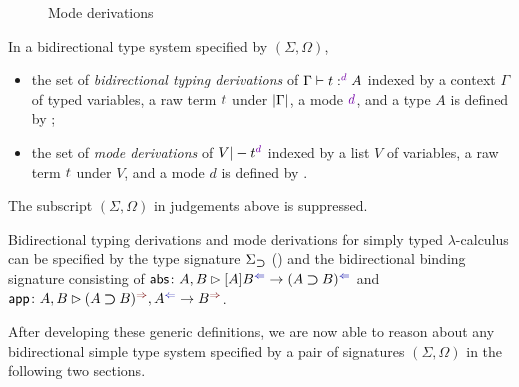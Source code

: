 \begin{definition}
\begin{figure}
    \caption{Mode derivations}
    \label{fig:mode-derivations}
  \end{figure}
  In a bidirectional type system specified by $(\Sigma, \Omega)$,
  \begin{itemize}
    \item the set of \emph{bidirectional typing derivations} of $\Gamma \vdash t :^\dir{d} A$ indexed by a context $\Gamma$ of typed variables, a raw term $\isTerm{t}$ under $\left|\Gamma\right|$, a mode $\dir{d}$, and a type $A$ is defined by ;
    \item the set of \emph{mode derivations} of $V |- t^\dir{d}$ indexed by a list $V$ of variables, a raw term $\isTerm{t}$ under $V$, and a mode $d$ is defined by .
  \end{itemize}
  The subscript $(\Sigma, \Omega)$ in judgements above is suppressed.
\end{definition}

\begin{example}
  Bidirectional typing derivations and mode derivations for simply typed $\lambda$-calculus can be specified by the type signature $\Sigma_{\mathbin{\bm{\supset}}}$ () and the bidirectional binding signature consisting of $\mathsf{abs}\colon A , B \rhd [A]B^{\chk} \to (A \bto B)^{\chk}$ and $\mathsf{app}\colon A, B \rhd (A \bto B)^{\syn}, A^{\chk} \to B^{\syn}$.
\end{example}

After developing these generic definitions, we are now able to reason about any bidirectional simple type system specified by a pair of signatures $(\Sigma, \Omega)$ in the following two sections.
